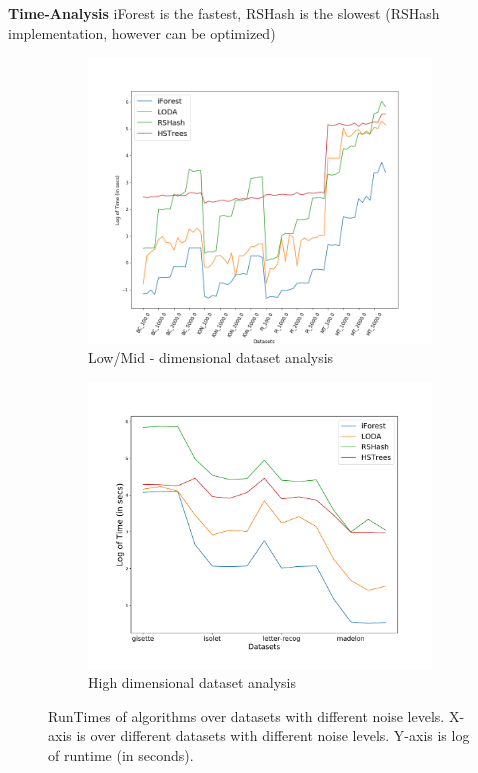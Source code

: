 \textbf{Time-Analysis}
iForest is the fastest, RSHash is the slowest (RSHash implementation, however can be optimized)
\begin{figure}[ht!]
    \centering
    \begin{subfigure}[t]{0.48\textwidth}
        \centering
        \includegraphics[width=\linewidth]{fig/baseline/TimeAnalysis_LowDim.png}
        \caption{Low/Mid - dimensional dataset analysis}
    \end{subfigure}
    \hfill
    \begin{subfigure}[t]{0.48\textwidth}
        \centering
        \includegraphics[width=\linewidth]{fig/baseline/TimeAnalysis_HighDim.pdf}
        \caption{High dimensional dataset analysis}
    \end{subfigure}
		\hfill
    \caption{RunTimes of algorithms over datasets with different noise levels. X-axis is over different datasets with different noise levels. Y-axis is log of runtime (in seconds).}
\end{figure}


